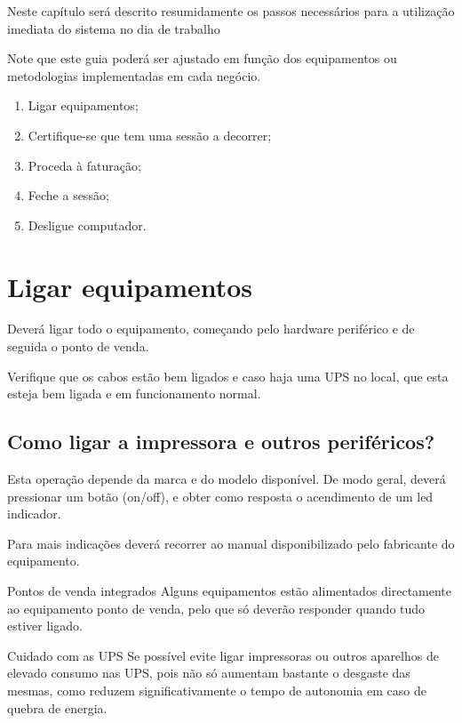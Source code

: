 \documentclass[a4paper,11pt,openany]{memoir}
\begin{document}
Neste capítulo será descrito resumidamente os passos necessários para a utilização imediata do sistema no dia de trabalho

Note que este guia poderá ser ajustado em função dos equipamentos ou metodologias implementadas em cada negócio.

\begin{enumerate}
	\item Ligar equipamentos;
	\item Certifique-se que tem uma sessão a decorrer;
	\item Proceda à faturação;
	\item Feche a sessão;
	\item Desligue computador.
\end{enumerate}


\section{Ligar equipamentos}

Deverá ligar todo o equipamento, começando pelo hardware periférico e de seguida
o ponto de venda.

Verifique que os cabos estão bem ligados e caso haja uma UPS no local, que esta esteja 
bem ligada e em funcionamento normal.

\subsection{Como ligar a impressora e outros periféricos?}
Esta operação depende da marca e do modelo disponível. De modo geral, deverá
pressionar um botão (on/off), e obter como resposta o acendimento de um led
indicador.

Para mais indicações deverá recorrer ao manual disponibilizado pelo fabricante do
equipamento.

\begin{bclogo}[couleur=blue!10,arrondi=0.1,logo=\bclampe,ombre=true]{Pontos de venda integrados}
Alguns equipamentos estão alimentados directamente ao equipamento ponto de venda, 
pelo que só deverão responder quando tudo estiver ligado.
\end{bclogo}

\begin{bclogo}[couleur=blue!10,arrondi=0.1,logo=\bctakecare,ombre=true]{Cuidado com as UPS}
Se possível evite ligar impressoras ou outros aparelhos de elevado consumo nas UPS,
pois não só aumentam bastante o desgaste das mesmas, como reduzem significativamente o tempo de autonomia
em caso de quebra de energia.
\end{bclogo}
\end{document}
